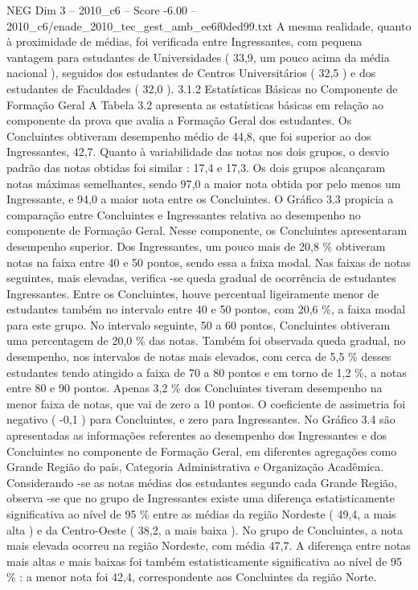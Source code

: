 \begin{textsample}{NEG Dim 3 – 2010\_c6 – Score -6.00 – 2010\_c6/enade\_2010\_tec\_gest\_amb\_ee6f0ded99.txt}
A mesma realidade, quanto à proximidade de médias, foi verificada entre Ingressantes, com pequena vantagem para estudantes de Universidades ( 33,9, um pouco acima da média nacional ), seguidos dos estudantes de Centros Universitários ( 32,5 ) e dos estudantes de Faculdades ( 32,0 ). 3.1.2 Estatísticas Básicas no Componente de Formação Geral A Tabela 3.2 apresenta as estatísticas básicas em relação ao componente da prova que avalia a Formação Geral dos estudantes.
Os Concluintes obtiveram desempenho médio de 44,8, que foi superior ao dos Ingressantes, 42,7.
Quanto à variabilidade das notas nos dois grupos, o desvio padrão das notas obtidas foi similar : 17,4 e 17,3.
Os dois grupos alcançaram notas máximas semelhantes, sendo 97,0 a maior nota obtida por pelo menos um Ingressante, e 94,0 a maior nota entre os Concluintes.
O Gráfico 3.3 propicia a comparação entre Concluintes e Ingressantes relativa ao desempenho no componente de Formação Geral.
Nesse componente, os Concluintes apresentaram desempenho superior.
Dos Ingressantes, um pouco mais de 20,8 \% obtiveram notas na faixa entre 40 e 50 pontos, sendo essa a faixa modal.
Nas faixas de notas seguintes, mais elevadas, verifica -se queda gradual de ocorrência de estudantes Ingressantes.
Entre os Concluintes, houve percentual ligeiramente menor de estudantes também no intervalo entre 40 e 50 pontos, com 20,6 \%, a faixa modal para este grupo.
No intervalo seguinte, 50 a 60 pontos, Concluintes obtiveram uma percentagem de 20,0 \% das notas.
Também foi observada queda gradual, no desempenho, nos intervalos de notas mais elevados, com cerca de 5,5 \% desses estudantes tendo atingido a faixa de 70 a 80 pontos e em torno de 1,2 \%, a notas entre 80 e 90 pontos.
Apenas 3,2 \% dos Concluintes tiveram desempenho na menor faixa de notas, que vai de zero a 10 pontos.
O coeficiente de assimetria foi negativo ( -0,1 ) para Concluintes, e zero para Ingressantes.
No Gráfico 3.4 são apresentadas as informações referentes ao desempenho dos Ingressantes e dos Concluintes no componente de Formação Geral, em diferentes agregações como Grande Região do país, Categoria Administrativa e Organização Acadêmica.
Considerando -se as notas médias dos estudantes segundo cada Grande Região, observa -se que no grupo de Ingressantes existe uma diferença estatisticamente significativa ao nível de 95 \% entre as médias da região Nordeste ( 49,4, a mais alta ) e da Centro-Oeste ( 38,2, a mais baixa ).
No grupo de Concluintes, a nota mais elevada ocorreu na região Nordeste, com média 47,7.
A diferença entre notas mais altas e mais baixas foi também estatisticamente significativa ao nível de 95 \% : a menor nota foi 42,4, correspondente aos Concluintes da região Norte.

\end{textsample}
